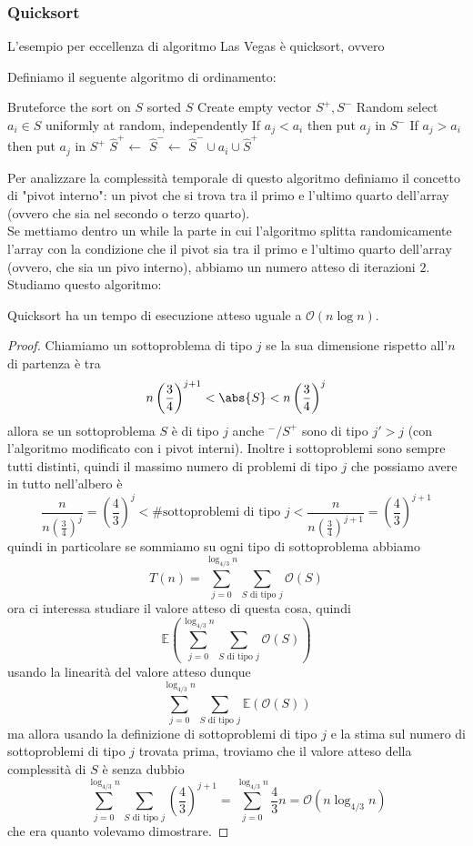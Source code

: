 \documentclass[11pt]{scrartcl}
\newcommand{\bigo}{\mathcal{O}}
\begin{document}
	\subsubsection{Quicksort}
	L'esempio per eccellenza di algoritmo Las Vegas è quicksort, ovvero 
	\begin{algorithm}[Quicksort]
		Definiamo il seguente algoritmo di ordinamento:
		\begin{algorithmic}[1]
					\State Bruteforce the sort on $S$
					\State \Return sorted $S$
				\EndIf
				\State Create empty vector $S^+,S^-$
				\State Random select $a_i\in S$ uniformly at random, independently
					\State If $a_j<a_i$ then put $a_j$ in $S^-$
					\State If $a_j>a_i$ then put $a_j$ in $S^+$
				\EndFor
				\State $\hat{S}^+\gets$
				\State $\hat{S}^-\gets$
				\State \Return $\hat{S}^-\cup a_i \cup \hat{S}^+$
			\EndFunction
		\end{algorithmic}
	\end{algorithm}
	Per analizzare la complessità temporale di questo algoritmo definiamo il concetto di "pivot interno": un pivot che si trova tra il primo e l'ultimo quarto dell'array (ovvero che sia nel secondo o terzo quarto). \\
	Se mettiamo dentro un while la parte in cui l'algoritmo splitta randomicamente l'array con la condizione che il pivot sia tra il primo e l'ultimo quarto dell'array (ovvero, che sia un pivo interno), abbiamo un numero atteso di iterazioni $2$. Studiamo questo algoritmo:
	\begin{theorem}
		Quicksort ha un tempo di esecuzione atteso uguale a $\bigo(n\log n)$.
	\end{theorem}
	\begin{proof}
		Chiamiamo un sottoproblema di tipo $j$ se la sua dimensione rispetto all'$n$ di partenza è tra
		$$n\left(\frac{3}{4}\right)^{j+1}<\abs{S}<n\left(\frac{3}{4}\right)^j$$
		allora se un sottoproblema $S$ è di tipo $j$ anche $^-/S^+$ sono di tipo $j'>j$ (con l'algoritmo modificato con i pivot interni). Inoltre i sottoproblemi sono sempre tutti distinti, quindi il massimo numero di problemi di tipo $j$ che possiamo avere in tutto nell'albero è 
		$$\frac{n}{n\left(\frac{3}{4}\right)^{j}}=\left(\frac{4}{3}\right)^{j}<\#\text{sottoproblemi di tipo $j$}<\frac{n}{n\left(\frac{3}{4}\right)^{j+1}}=\left(\frac{4}{3}\right)^{j+1}$$
		quindi in particolare se sommiamo su ogni tipo di sottoproblema abbiamo
		$$T(n)=\sum_{j=0}^{\log_{4/3}n}\sum_{S \text{ di tipo $j$}}\bigo(S)$$ 
		ora ci interessa studiare il valore atteso di questa cosa, quindi
		$$\mathbb{E}\left(\sum_{j=0}^{\log_{4/3}n}\sum_{S \text{ di tipo $j$}}\bigo(S)\right)$$
		usando la linearità del valore atteso dunque
		$$\sum_{j=0}^{\log_{4/3}n}\sum_{S \text{ di tipo $j$}}\mathbb{E}\left(\bigo(S)\right)$$
		ma allora usando la definizione di sottoproblemi di tipo $j$ e la stima sul numero di sottoproblemi di tipo $j$ trovata prima, troviamo che il valore atteso della complessità di $S$ è senza dubbio 
		$$\sum_{j=0}^{\log_{4/3}n}\sum_{S \text{ di tipo $j$}}\left(\frac{4}{3}\right)^{j+1}=\sum_{j=0}^{\log_{4/3}n}\frac{4}{3}n=\bigo(n\log_{4/3}n)$$
		che era quanto volevamo dimostrare.
	\end{proof}
\end{document}
